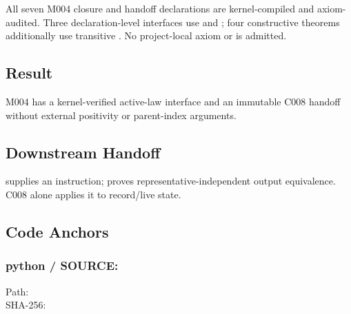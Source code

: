 All seven M004 closure and handoff declarations are kernel-compiled and
axiom-audited. Three declaration-level interfaces use \texttt{\protect{}}
and \texttt{\protect{}}; four constructive theorems additionally use
transitive \texttt{\protect{}}. No project-local axiom or
\texttt{\protect{}} is admitted.

\subsection{Result}\label{result-25}

M004 has a kernel-verified active-law interface and an immutable C008
handoff without external positivity or parent-index arguments.

\subsection{Downstream Handoff}\label{downstream-handoff-25}

\texttt{\protect{}} supplies an
instruction; \texttt{\protect{}} proves
representative-independent output equivalence. C008 alone applies it to
record/live state.

\subsection{Code Anchors}\label{code-anchors-15}

\subsubsection{\texorpdfstring{python / SOURCE:
\texttt{\protect{}}}{python / SOURCE: s10\_m004\_\_response\_coupled\_birth\_law\_birthlaw\_b.py}}\label{python-source-s10_m004__response_coupled_birth_law_birthlaw_b.py}

Path:
\texttt{\protect{}}\\
SHA-256:
\texttt{\protect{}}


